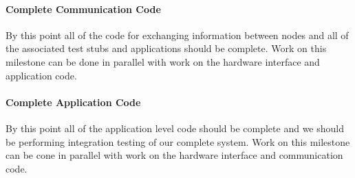 \paragraph{Complete Communication Code}
By this point all of the code for exchanging information between nodes and all
of the associated test stubs and applications should be complete. Work on this
milestone can be done in parallel with work on the hardware interface and
application code.

\paragraph{Complete Application Code}
By this point all of the application level code should be complete and we should
be performing integration testing of our complete system. Work on this milestone
can be cone in parallel with work on the hardware interface and communication
code.

